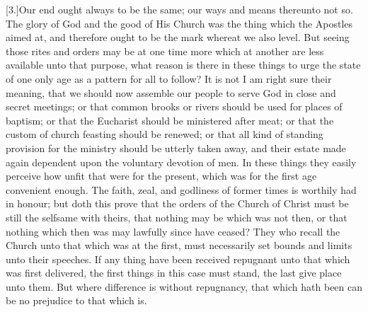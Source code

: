 [3.]Our end ought always to be the same; our ways and means thereunto not so. The glory of God and the good of His Church was the thing which the Apostles aimed at, and therefore ought to be the mark whereat we also level. But seeing those rites and orders may be at one time more which  at another are less available unto that purpose, what reason is there in these things to urge the state of one only age as a pattern for all to follow? It is not I am right sure their meaning, that we should now assemble our people to serve God in close and secret meetings; or that common brooks or rivers should be used for places of baptism; or that the Eucharist should be ministered after meat; or that the custom of church feasting should be renewed; or that all kind of standing provision for the ministry should be utterly taken away, and their estate made again dependent upon the voluntary devotion of men. In these things they easily perceive how unfit that were for the present, which was for the first age convenient enough. The faith, zeal, and godliness of former times is worthily had in honour; but doth this prove that the orders of the Church of Christ must be still the selfsame with theirs, that nothing may be which was not then, or that nothing which then was may lawfully since have ceased? They who recall the Church unto that which was at the first, must necessarily set bounds and limits unto their speeches. If any thing have been received repugnant unto that which was first delivered, the first things in this case must stand, the last give place unto them. But where difference is without repugnancy, that which hath been can be no prejudice to that which is.

